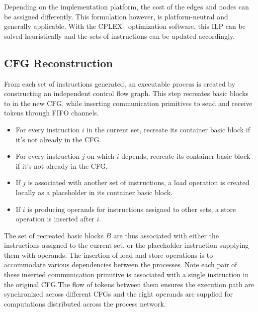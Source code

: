 \documentclass{sig-alternate}
\begin{document}
Depending on the implementation platform, the cost of the edges and nodes can be assigned differently. This formulation however, is platform-neutral and generally applicable.
With the CPLEX~\cite{iILO06a} optimization software, this ILP can be solved heuristically and the sets of instructions can be updated accordingly.


\subsection{CFG Reconstruction}
From each set of instructions generated,
an executable process is created by constructing an independent control flow graph. This step recreates basic blocks to in the new CFG, while inserting communication primitives to send and receive tokens through FIFO channels.
\begin{itemize}
    \item For every instruction $i$  in the current set, recreate
    its container basic block if it's not already in the CFG.
    \item For every instruction $j$ on which $i$ depends, 
    recreate its container basic block if it's not already
    in the CFG.
    \item If $j$ is associated with another set of instructions, a load operation
    is created locally as a placeholder in its container basic block.
    \item If $i$ is producing operands for instructions assigned to 
    other sets, a store operation is inserted after $i$.
\end{itemize}
The set of recreated basic blocks $B$ are thus associated with either the instructions assigned to the current set, or the placeholder instruction supplying them with operands. 
The insertion of load and store operations is to accommodate various
dependencies between the processes. Note each pair of these inserted communication primitive is associated with a single instruction in the original CFG.The flow of
tokens between them ensures the execution path are synchronized across different CFGs
and the right operands are supplied for computations distributed across the
process network. 
\end{document}
